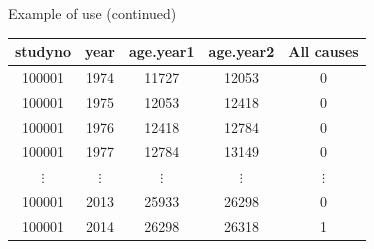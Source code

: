 \documentclass[
  ignorenonframetext,
  aspectratio=169,
]{beamer}
\begin{document}
\begin{frame}{Example of use (continued)}
\protect\hypertarget{example-of-use-continued}{}

\begin{center}\ttfamily
\begin{tabular}{ccccc}
  \toprule
studyno & year & age.year1 & age.year2 & All causes \\ 
  \midrule
100001 & 1974 & 11727 & 12053 & 0 \\ 
  100001 & 1975 & 12053 & 12418 & 0 \\ 
  100001 & 1976 & 12418 & 12784 & 0 \\ 
  100001 & 1977 & 12784 & 13149 & 0 \\ 
  $\vdots$ & $\vdots$ & $\vdots$ & $\vdots$ & $\vdots$ \\
  100001 & 2013 & 25933 & 26298 & 0 \\ 
  100001 & 2014 & 26298 & 26318 & 1 \\ 
   \bottomrule
\end{tabular}
\end{center}

\end{frame}
\end{document}
